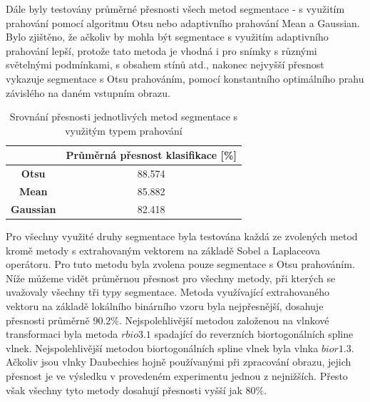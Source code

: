 Dále byly testovány průměrné přesnosti všech metod segmentace - s využitím prahování pomocí algoritmu Otsu nebo adaptivního prahování Mean a Gaussian. Bylo zjištěno, že ačkoliv by mohla být segmentace s využitím adaptivního prahování lepší, protože tato metoda je vhodná i pro snímky s různými světelnými podmínkami, s obsahem stínů atd., nakonec nejvyšší přesnost vykazuje segmentace s Otsu prahováním, pomocí konstantního optimálního prahu závislého na daném vstupním obrazu.

\capstartfalse
\begin{table}[!htbp]
\centering
\begin{tabular}{|c|c|}
\hline
                  & \textbf{Průměrná přesnost klasifikace {[}\%{]}} \\ \hline
\textbf{Otsu}     & 88.574                                         \\ \hline
\textbf{Mean}     & 85.882                                         \\ \hline
\textbf{Gaussian} & 82.418                                         \\ \hline
\end{tabular}
\caption{Srovnání přesnosti jednotlivých metod segmentace s využitým typem prahování}
\end{table}
\capstarttrue

 Pro všechny využité druhy segmentace byla testována každá ze zvolených metod kromě metody s extrahovaným vektorem na základě Sobel a Laplaceova operátoru. Pro tuto metodu byla zvolena pouze segmentace s Otsu prahováním. Níže můžeme vidět průměrnou přesnost pro všechny metody, při kterých se uvažovaly všechny tři typy segmentace. Metoda využívající extrahovaného vektoru na základě lokálního binárního vzoru byla nejpřesnější, dosahuje přesnosti průměrně 90.2\%. Nejspolehlivější metodou založenou na vlnkové transformaci byla metoda $rbio3.1$ spadající do reverzních biortogonálních spline vlnek. Nejspolehlivější metodou biortogonálních spline vlnek byla vlnka $bior1.3$. Ačkoliv jsou vlnky Daubechies hojně používanými při zpracování obrazu, jejich přesnost je ve výsledku v provedeném experimentu jednou z nejnižších. Přesto však všechny tyto metody dosahují přesnosti vyšší jak 80\%.
 
